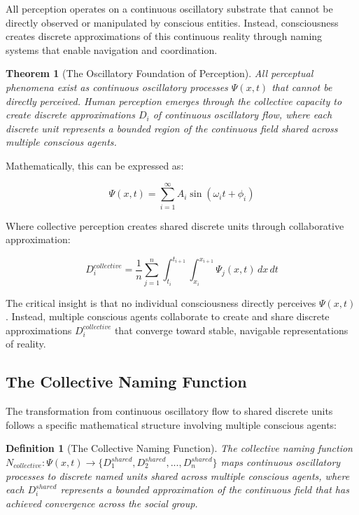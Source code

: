 \documentclass[12pt]{article}
\newtheorem{theorem}{Theorem}
\newtheorem{definition}{Definition}
\begin{document}
All perception operates on a continuous oscillatory substrate that cannot be directly observed or manipulated by conscious entities. Instead, consciousness creates discrete approximations of this continuous reality through naming systems that enable navigation and coordination.

\begin{theorem}[The Oscillatory Foundation of Perception]
All perceptual phenomena exist as continuous oscillatory processes $\Psi(x,t)$ that cannot be directly perceived. Human perception emerges through the collective capacity to create discrete approximations $D_i$ of continuous oscillatory flow, where each discrete unit represents a bounded region of the continuous field shared across multiple conscious agents.
\end{theorem}

Mathematically, this can be expressed as:

$$\Psi(x,t) = \sum_{i=1}^{\infty} A_i \sin(\omega_i t + \phi_i)$$

Where collective perception creates shared discrete units through collaborative approximation:

$$D_i^{collective} = \frac{1}{n} \sum_{j=1}^{n} \int_{t_i}^{t_{i+1}} \int_{x_i}^{x_{i+1}} \Psi_j(x,t) \, dx \, dt$$

The critical insight is that no individual consciousness directly perceives $\Psi(x,t)$. Instead, multiple conscious agents collaborate to create and share discrete approximations $D_i^{collective}$ that converge toward stable, navigable representations of reality.

\subsection{The Collective Naming Function}

The transformation from continuous oscillatory flow to shared discrete units follows a specific mathematical structure involving multiple conscious agents:

\begin{definition}[The Collective Naming Function]
The collective naming function $N_{collective}: \Psi(x,t) \rightarrow \{D_1^{shared}, D_2^{shared}, ..., D_n^{shared}\}$ maps continuous oscillatory processes to discrete named units shared across multiple conscious agents, where each $D_i^{shared}$ represents a bounded approximation of the continuous field that has achieved convergence across the social group.
\end{definition}
\end{document}
